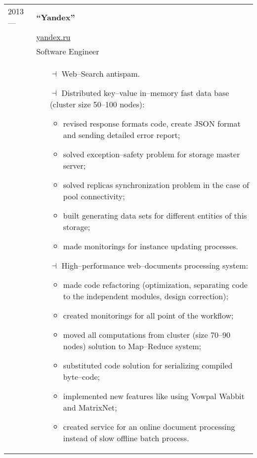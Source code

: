 \documentclass[a4paper, 10pt]{article}
\begin{document}
\begin{longtable}{p{20mm}|p{140mm}}
2013 ---
& \textbf{``Yandex''} \\
& \href{https://yandex.ru/}{yandex.ru} \\
& Software Engineer \\
& \begin{itemize}[topsep = 0pt, itemsep = 0pt]
    \item[$\dashv$] Web--Search antispam.
    \item[$\dashv$] Distributed key--value in--memory fast data base (cluster size 50--100 nodes):
        \begin{itemize}[topsep = 0pt, itemsep = 0pt]
            \item revised response formats code, create JSON format and sending detailed error report;
            \item solved exception--safety problem for storage master server;
            \item solved replicas synchronization problem in the case of pool connectivity;
            \item built generating data sets for different entities of this storage;
            \item made monitorings for instance updating processes.
        \end{itemize}
    \item[$\dashv$] High--performance web--documents processing system:
        \begin{itemize}[topsep = 0pt, itemsep = 0pt]
            \item made code refactoring (optimization, separating code to the independent modules, design correction);
            \item created monitorings for all point of the workflow;
            \item moved all computations from cluster (size 70--90 nodes) solution to Map--Reduce system;
            \item substituted code solution for serializing compiled byte--code;
            \item implemented new features like using Vowpal Wabbit and MatrixNet;
            \item created service for an online document processing instead of slow offline batch process.
        \end{itemize}
\end{itemize}
\\


\end{longtable}
\end{document}
